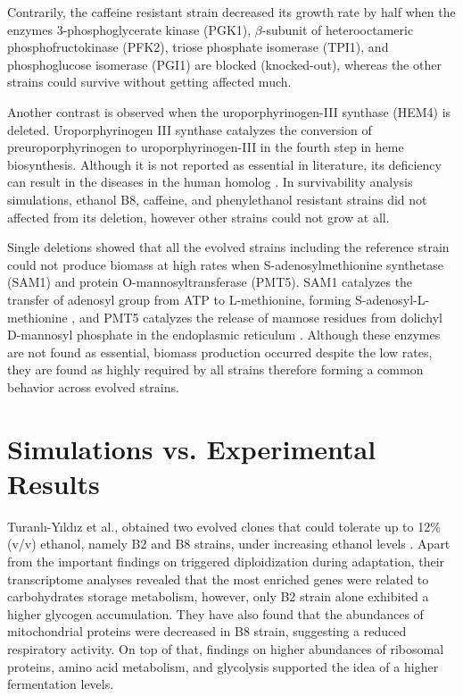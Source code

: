 Contrarily, the caffeine resistant strain decreased its growth rate by half when the enzymes 3-phosphoglycerate kinase (PGK1), $\beta $-subunit of heterooctameric phosphofructokinase (PFK2), triose phosphate isomerase (TPI1), and phosphoglucose isomerase (PGI1) are blocked (knocked-out), whereas the other strains could survive without getting affected much.

Another contrast is observed when the uroporphyrinogen-III synthase (HEM4) is deleted. Uroporphyrinogen III synthase catalyzes the conversion of preuroporphyrinogen to uroporphyrinogen-III in the fourth step in heme biosynthesis\cite{amillet1995isolation}. Although it is not reported as essential in literature, its deficiency can result in the diseases in the human homolog \cite{tan2008identification}. In survivability analysis simulations, ethanol B8, caffeine, and phenylethanol resistant strains did not affected from its deletion, however other strains could not grow at all.

Single deletions showed that all the evolved strains including the reference strain could not produce biomass at high rates when S-adenosylmethionine synthetase (SAM1) and protein O-mannosyltransferase (PMT5). SAM1 catalyzes the transfer of adenosyl group from ATP to L-methionine, forming S-adenosyl-L-methionine \cite{chiang1977activation}, and PMT5 catalyzes the release of mannose residues from dolichyl D-mannosyl phosphate in the endoplasmic reticulum \cite{girrbach2003members}. Although these enzymes are not found as essential, biomass production occurred despite the low rates, they are found as highly required by all strains therefore forming a common behavior across evolved strains.

\section{Simulations vs. Experimental Results}
Turanlı-Yıldız et al., obtained two evolved clones that could tolerate up to 12\% (v/v) ethanol, namely B2 and B8 strains, under increasing ethanol levels \cite{TuranlYldz2017}. Apart from the important findings on triggered diploidization during adaptation, their transcriptome analyses revealed that the most enriched genes were related to carbohydrates storage metabolism, however, only B2 strain alone exhibited a higher glycogen accumulation. They have also found that the abundances of mitochondrial proteins were decreased in B8 strain, suggesting a reduced respiratory activity. On top of that, findings on higher abundances of ribosomal proteins, amino acid metabolism, and glycolysis supported the idea of a higher fermentation levels.

